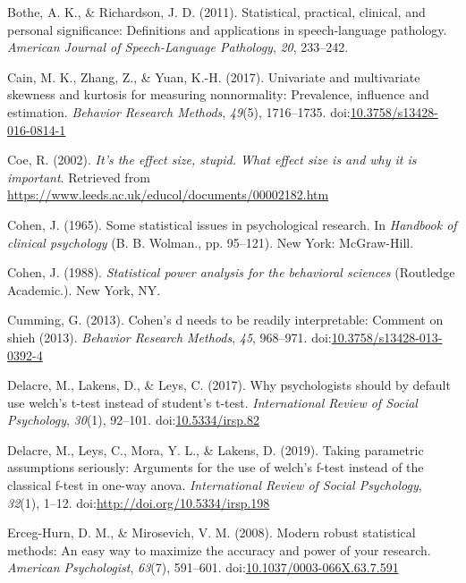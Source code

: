 \documentclass[
  man]{apa6}
\begin{document}
\leavevmode\hypertarget{ref-Bothe_Richardson_2011}{}%
Bothe, A. K., \& Richardson, J. D. (2011). Statistical, practical, clinical, and personal significance: Definitions and applications in speech-language pathology. \emph{American Journal of Speech-Language Pathology}, \emph{20}, 233--242.

\leavevmode\hypertarget{ref-Cain_et_al_2017}{}%
Cain, M. K., Zhang, Z., \& Yuan, K.-H. (2017). Univariate and multivariate skewness and kurtosis for measuring nonnormality: Prevalence, influence and estimation. \emph{Behavior Research Methods}, \emph{49}(5), 1716--1735. doi:\href{https://doi.org/10.3758/s13428-016-0814-1}{10.3758/s13428-016-0814-1}

\leavevmode\hypertarget{ref-Coe_2002}{}%
Coe, R. (2002). \emph{It's the effect size, stupid. What effect size is and why it is important}. Retrieved from \url{https://www.leeds.ac.uk/educol/documents/00002182.htm}

\leavevmode\hypertarget{ref-Cohen_1965}{}%
Cohen, J. (1965). Some statistical issues in psychological research. In \emph{Handbook of clinical psychology} (B. B. Wolman., pp. 95--121). New York: McGraw-Hill.

\leavevmode\hypertarget{ref-Cohen_1988}{}%
Cohen, J. (1988). \emph{Statistical power analysis for the behavioral sciences} (Routledge Academic.). New York, NY.

\leavevmode\hypertarget{ref-Cumming_2013}{}%
Cumming, G. (2013). Cohen's d needs to be readily interpretable: Comment on shieh (2013). \emph{Behavior Research Methods}, \emph{45}, 968--971. doi:\href{https://doi.org/10.3758/s13428-013-0392-4}{10.3758/s13428-013-0392-4}

\leavevmode\hypertarget{ref-Delacre_et_al_2017}{}%
Delacre, M., Lakens, D., \& Leys, C. (2017). Why psychologists should by default use welch's t-test instead of student's t-test. \emph{International Review of Social Psychology}, \emph{30}(1), 92--101. doi:\href{https://doi.org/10.5334/irsp.82}{10.5334/irsp.82}

\leavevmode\hypertarget{ref-Delacre_et_al_2019}{}%
Delacre, M., Leys, C., Mora, Y. L., \& Lakens, D. (2019). Taking parametric assumptions seriously: Arguments for the use of welch's f-test instead of the classical f-test in one-way anova. \emph{International Review of Social Psychology}, \emph{32}(1), 1--12. doi:\href{https://doi.org/http://doi.org/10.5334/irsp.198}{http://doi.org/10.5334/irsp.198}

\leavevmode\hypertarget{ref-Erceg-Hurn_Mirosevich_2008}{}%
Erceg-Hurn, D. M., \& Mirosevich, V. M. (2008). Modern robust statistical methods: An easy way to maximize the accuracy and power of your research. \emph{American Psychologist}, \emph{63}(7), 591--601. doi:\href{https://doi.org/10.1037/0003-066X.63.7.591}{10.1037/0003-066X.63.7.591}
\end{document}
